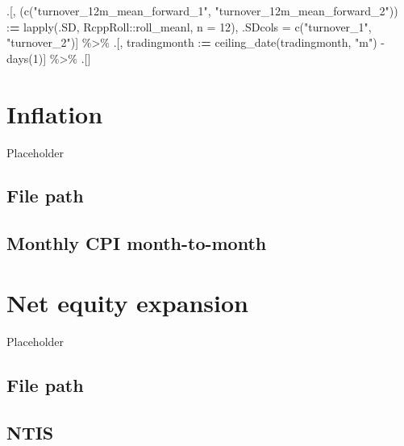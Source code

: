 \documentclass[
]{article}
\newenvironment{Shaded}{\begin{snugshade}}{\end{snugshade}}
\newcommand{\AttributeTok}[1]{\textcolor[rgb]{0.77,0.63,0.00}{#1}}
\newcommand{\DecValTok}[1]{\textcolor[rgb]{0.00,0.00,0.81}{#1}}
\newcommand{\ErrorTok}[1]{\textcolor[rgb]{0.64,0.00,0.00}{\textbf{#1}}}
\newcommand{\FunctionTok}[1]{\textcolor[rgb]{0.00,0.00,0.00}{#1}}
\newcommand{\NormalTok}[1]{#1}
\newcommand{\OtherTok}[1]{\textcolor[rgb]{0.56,0.35,0.01}{#1}}
\newcommand{\SpecialCharTok}[1]{\textcolor[rgb]{0.00,0.00,0.00}{#1}}
\newcommand{\StringTok}[1]{\textcolor[rgb]{0.31,0.60,0.02}{#1}}
\begin{document}
\begin{Shaded}
\begin{Highlighting}[]
\NormalTok{  .[, (}\FunctionTok{c}\NormalTok{(}\StringTok{"turnover\_12m\_mean\_forward\_1"}\NormalTok{, }\StringTok{"turnover\_12m\_mean\_forward\_2"}\NormalTok{)) }\SpecialCharTok{:}\ErrorTok{=} \FunctionTok{lapply}\NormalTok{(.SD, RcppRoll}\SpecialCharTok{::}\NormalTok{roll\_meanl, }\AttributeTok{n =} \DecValTok{12}\NormalTok{), .SDcols }\OtherTok{=} \FunctionTok{c}\NormalTok{(}\StringTok{"turnover\_1"}\NormalTok{, }\StringTok{"turnover\_2"}\NormalTok{)] }\SpecialCharTok{\%\textgreater{}\%} 
\NormalTok{  .[, tradingmonth }\SpecialCharTok{:}\ErrorTok{=} \FunctionTok{ceiling\_date}\NormalTok{(tradingmonth, }\StringTok{"m"}\NormalTok{) }\SpecialCharTok{{-}}\FunctionTok{days}\NormalTok{(}\DecValTok{1}\NormalTok{)] }\SpecialCharTok{\%\textgreater{}\%} 
\NormalTok{  .[]}
\end{Highlighting}
\end{Shaded}

\hypertarget{inflation}{%
\section{Inflation}\label{inflation}}

Placeholder

\hypertarget{file-path-3}{%
\subsection{File path}\label{file-path-3}}

\hypertarget{monthly-cpi-month-to-month}{%
\subsection{Monthly CPI month-to-month}\label{monthly-cpi-month-to-month}}

\hypertarget{net-equity-expansion}{%
\section{Net equity expansion}\label{net-equity-expansion}}

Placeholder

\hypertarget{file-path-4}{%
\subsection{File path}\label{file-path-4}}

\hypertarget{ntis}{%
\subsection{NTIS}\label{ntis}}
\end{document}
